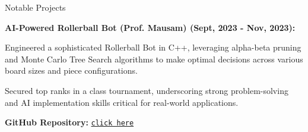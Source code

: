 \begin{rubric}{Notable Projects}



    \entry*
\textbf{AI-Powered Rollerball Bot (Prof. Mausam) (Sept, 2023 - Nov, 2023):}\par
Engineered a sophisticated Rollerball Bot in C++, leveraging alpha-beta pruning and Monte Carlo Tree Search algorithms to make optimal decisions across various board sizes and piece configurations.\par
Secured top ranks in a class tournament, underscoring strong problem-solving and AI implementation skills critical for real-world applications.\par
\textbf{GitHub Repository:} \href{https://github.com/suchith83/COL333_assignment5}{\texttt{click here}}



\end{rubric}
